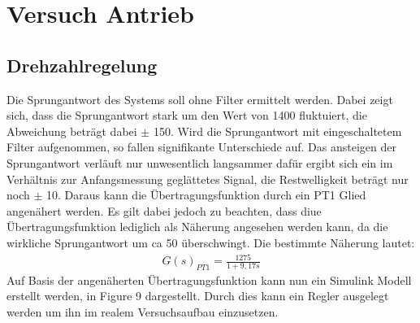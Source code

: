 \documentclass[10pt]{scrartcl}
\begin{document}
\section{Versuch Antrieb}
\subsection{Drehzahlregelung}
Die Sprungantwort des Systems soll ohne Filter ermittelt werden. Dabei zeigt sich, dass die Sprungantwort stark um den Wert von 1400 fluktuiert, die Abweichung beträgt dabei $\pm$ 150.
Wird die Sprungantwort mit eingeschaltetem Filter aufgenommen, so fallen signifikante Unterschiede auf. Das ansteigen der Sprungantwort verläuft nur unwesentlich langsammer dafür ergibt sich ein im Verhältnis zur Anfangsmessung geglättetes Signal, die Restwelligkeit  beträgt nur noch $\pm$ 10. Daraus kann die Übertragungsfunktion durch ein PT1 Glied angenähert werden. Es gilt dabei jedoch zu beachten, dass diue Übertragungsfunktion lediglich als Näherung angesehen werden kann, da die wirkliche Sprungantwort um ca 50 überschwingt. Die bestimmte Näherung lautet: 
\begin{align}
   G(s)_{PT1}=\frac{1275}{1+9,17s}
\end{align}
Auf Basis der angenäherten Übertragungsfunktion kann nun ein Simulink Modell erstellt werden, in Figure 9 dargestellt. Durch dies kann ein Regler ausgelegt werden um ihn im realem Versuchsaufbau einzusetzen.\\
\end{document}
